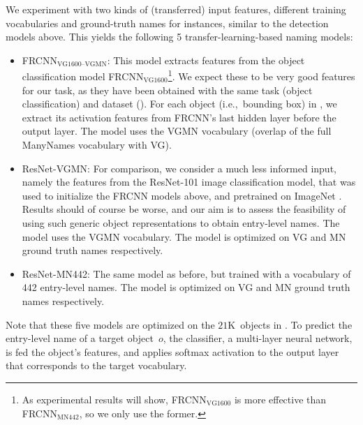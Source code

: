 We experiment with two kinds of (transferred) input features, different training vocabularies and ground-truth names for instances, similar to the detection models above.
This yields the following 5 transfer-learning-based naming models:
\begin{itemize}
\item FRCNN$_{\text{VG1600--VGMN}}$:
	This model extracts features from the object classification model FRCNN$_{\text{VG1600}}$\footnote{
	As experimental results will show, FRCNN$_{\text{VG1600}}$ is more effective than FRCNN$_{\text{MN442}}$, so we only use the former.
}. We expect these to be very good features for our task, as they have been obtained with the same task (object classification) and dataset (\vg).  For each object (i.e.,~bounding box) in \mn, we extract its activation features from FRCNN's last hidden layer before the output layer. The model uses the VGMN vocabulary (overlap of the full ManyNames vocabulary with VG).
  \item ResNet-VGMN: 
For comparison, we consider a much less informed input, namely the features from the ResNet-101 image classification model, that was used to initialize the FRCNN models above, and pretrained on ImageNet \cite{imagenet_cvpr09}. 
Results should of course be worse, and our aim is to assess the feasibility of using such generic object representations to obtain entry-level names. The model uses the VGMN vocabulary.  The model is optimized on VG and MN ground truth names respectively.
 \item  ResNet-MN442:
 The same model as before, but trained with a vocabulary of 442 entry-level names. The model is optimized on VG and MN ground truth names respectively.
\end{itemize}
Note that these five models are optimized on the $21$K~objects in \mn. 
To predict the entry-level name of a target object~$o$, the classifier, a multi-layer neural network, is fed the object's features, and applies softmax activation to the output layer that corresponds to the target vocabulary. 

